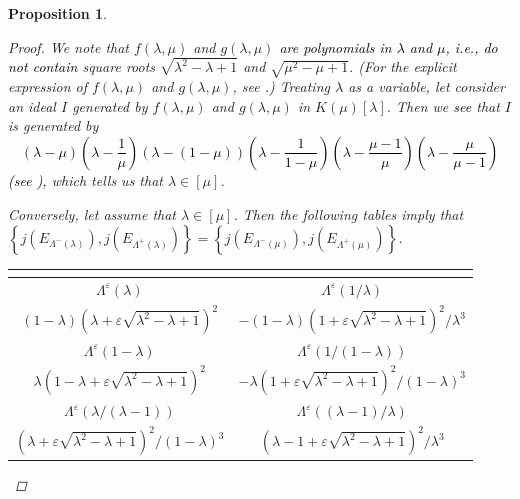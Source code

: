 \documentclass[a4paper, 11pt]{article}
\theoremstyle{plain}
\newtheorem{prop}[defn]{Proposition}
\newcommand{\?}{\textcolor{red}{??}}
\newcommand{\lm}{\lambda}
\newcommand{\Lm}{\Lambda}
\begin{document}
\begin{prop}
\begin{proof}
{}
We note that $f(\lm,\mu)$ and $g(\lm,\mu)$ \textcolor{black}{are polynomials in $\lm$ and $\mu$,
i.e., do not contain} square roots $\sqrt{\lm^2-\lm+1}$ and $\sqrt{\mu^2-\mu+1}$. (For the explicit expression of $f(\lm,\mu)$ and $g(\lm,\mu)$, see \cite[9-1]{Github}.) Treating $\lm$ as a variable, let consider an ideal $I$ generated by $f(\lm,\mu)$ and $g(\lm,\mu)$ in $K(\mu)[\lm]$. Then we \textcolor{black}{see} that $I$ is generated by 
       \textcolor{black}{
       \[
(\lm \!-\!\mu)\left(\!\lm-\frac{1}{\mu}\!\right)\left(\lm-(1-\mu)\right)\left(\!\lm-\frac{1}{1-\mu}\!\right)\left(\!\lm-\frac{\mu-1}{\mu}\!\right)\left(\!\lm-\frac{\mu}{\mu-1}\!\right)
       \]
       (see \cite[9-2]{Github}), }
    which tells us that $\lm\in[\mu]$. 

     Conversely, let assume that $\lm\in[\mu]$.  Then the following tables imply that $ \left\{j\left(E_{\Lambda^{-}(\lm)}\right),j\left(E_{\Lambda^{+}(\lm)}\right) \right\}=\left\{j\left(E_{\Lambda^{-}(\mu)} \right),j\left(E_{\Lambda^{+}(\mu)} \right)\right \}$. 
     \renewcommand{\arraystretch}{1.5} 
        \begin{center}
   \begin{tabular}{c||c}
    \multicolumn{2}{c}{} \\ \hline \hline

$\Lm^{\varepsilon}(\lm)$ &$\Lm^{\varepsilon}(1/\lm)$\\ \hline
$(1-\lm)(\lm+\varepsilon\sqrt{{\lm}^2-\lm+1})^2$ &$-(1-\lm)(1+\varepsilon\sqrt{\lm^2-\lm+1})^2/\lm^3$\\
\hline\hline
$\Lm^{\varepsilon}(1-\lm)$ & $\Lm^{\varepsilon}(1/(1-\lm))$ \\ \hline
$\lm(1-\lm+\varepsilon\sqrt{\lm^2-\lm+1})^2$ &  $-\lm (1+\varepsilon\sqrt{\lm^2-\lm+1})^2/(1-\lm)^3$ \\
\hline \hline
$\Lm^{\varepsilon}(\lm/(\lm-1))$ & $\Lm^{\varepsilon}((\lm-1)/\lm)$\\ \hline
$(\lm+\varepsilon\sqrt{\lm^2-\lm+1})^2/(1-\lm)^3$ & $(\lm-1+\varepsilon\sqrt{\lm^2-\lm+1})^2/\lm^3$\\
\hline \hline


\end{tabular}
\end{center}
\end{proof}
\end{prop}
\end{document}
